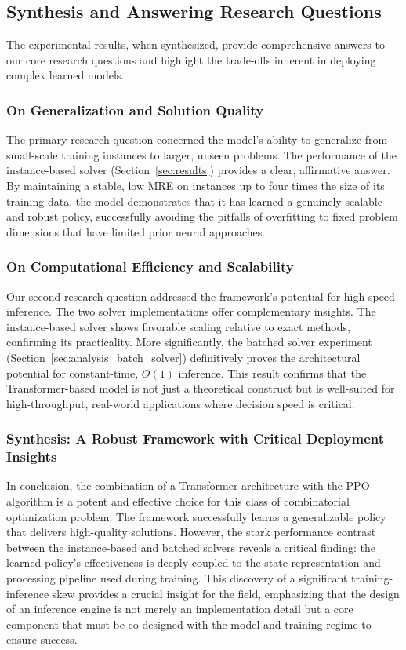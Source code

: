 \subsection{Synthesis and Answering Research Questions}
The experimental results, when synthesized, provide comprehensive answers to our core research questions and highlight the trade-offs inherent in deploying complex learned models.

\subsubsection{On Generalization and Solution Quality}
The primary research question concerned the model's ability to generalize from small-scale training instances to larger, unseen problems.
The performance of the instance-based solver (Section~\ref{sec:results}) provides a clear, affirmative answer.
By maintaining a stable, low MRE on instances up to four times the size of its training data, the model demonstrates that it has learned a genuinely scalable and robust policy, successfully avoiding the pitfalls of overfitting to fixed problem dimensions that have limited prior neural approaches.

\subsubsection{On Computational Efficiency and Scalability}
Our second research question addressed the framework's potential for high-speed inference.
The two solver implementations offer complementary insights. The instance-based solver shows favorable scaling relative to exact methods, confirming its practicality.
More significantly, the batched solver experiment (Section~\ref{sec:analysis_batch_solver}) definitively proves the architectural potential for constant-time, $O(1)$ inference.
This result confirms that the Transformer-based model is not just a theoretical construct but is well-suited for high-throughput, real-world applications where decision speed is critical.

\subsubsection{Synthesis: A Robust Framework with Critical Deployment Insights}
In conclusion, the combination of a Transformer architecture with the PPO algorithm is a potent and effective choice for this class of combinatorial optimization problem.
The framework successfully learns a generalizable policy that delivers high-quality solutions.
However, the stark performance contrast between the instance-based and batched solvers reveals a critical finding: the learned policy's effectiveness is deeply coupled to the state representation and processing pipeline used during training.
This discovery of a significant training-inference skew provides a crucial insight for the field, emphasizing that the design of an inference engine is not merely an implementation detail but a core component that must be co-designed with the model and training regime to ensure success.